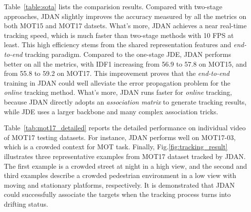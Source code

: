 \documentclass[acmsmall]{acmart}
\begin{document}
{
Table~\ref{table:sota} lists the comparision results.
Compared with two-stage approaches, JDAN slightly improves the accuracy measured by all the metrics on both MOT15 and MOT17 datsets.
What's more, JDAN achieves a near real-time tracking speed, which is much faster than two-stage methods with 10 FPS at least.
This high efficiency stems from the shared representation features and \emph{end-to-end} tracking paradigm.
Compared to the one-stage JDE, JDAN performs better on all the metrics, with IDF1 increasing from 56.9 to 57.8 on MOT15, and from 55.8 to 59.2 on MOT17.
This improvement proves that the \emph{end-to-end} training in JDAN could well alleviate the error propagation problem for the \emph{online} tracking method.
What's more, JDAN runs faster for \emph{online} tracking, because JDAN directly adopts an \emph{association matrix} to generate tracking results, while JDE uses a larger backbone and many complex association tricks.
}

{
Table~\ref{tab:mot17_detailed} reports the detailed performance on individual video of MOT17 testing datasets.
For instance, JDAN performs well on MOT17-03, which is a crowded context for MOT task.}
{
Finally, Fig.\ref{fig:tracking_result} illustrates three representative examples from MOT17 dataset tracked by JDAN.
The first example is a crowded street at night in a high view, 
and the second and third examples describe a crowded pedestrian environment in a low view with moving and stationary platforms, respectively.
It is demonstrated that JDAN could successfully associate the targets when the tracking process turns into drifting status.
}
\end{document}
